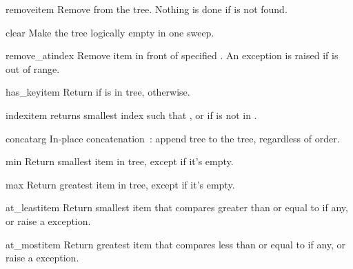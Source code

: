 \documentclass{howto}
\begin{document}
\begin{methoddesc}{remove}{item}
	Remove  from the tree. Nothing is done if  is not found.
\end{methoddesc}

\begin{methoddesc}{clear}{}
	Make the tree logically empty in one sweep.
\end{methoddesc}

\begin{methoddesc}{remove_at}{index}
	Remove item in front of specified .
	An  exception is raised if  is out of range.
\end{methoddesc}

\begin{methoddesc}{has_key}{item}
	Return  if  is in tree,  otherwise.
\end{methoddesc}

\begin{methoddesc}{index}{item}
	 returns smallest index  such that
	, or  if  is not in .
\end{methoddesc}

\begin{methoddesc}{concat}{arg}
	In-place concatenation~: 
	append tree  to the tree, regardless of order.
\end{methoddesc}

\begin{methoddesc}{min}{}
	Return smallest item in tree, except if it's empty.
\end{methoddesc}

\begin{methoddesc}{max}{}
	Return greatest item in tree, except if it's empty.
\end{methoddesc}

\begin{methoddesc}{at_least}{item}
	Return smallest item that compares greater than or equal to  if 
	any, or raise a  exception.
\end{methoddesc}

\begin{methoddesc}{at_most}{item}
	Return greatest item that compares less than or equal to  if 
	any, or raise a  exception.
\end{methoddesc}
\end{document}
